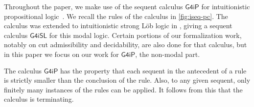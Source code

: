 \documentclass[english,final]{jflart}
\theoremstyle{definition}
\theoremstyle{plain}
\newcommand{\Gfourip}{\mathsf{G4iP}}
\newcommand{\Gfourisl}{\mathsf{G4iSL}}
\begin{document}
Throughout the paper, we make use of the sequent calculus $\Gfourip$ for intuitionistic propositional logic~\cite{Vor1952,Hud1988,Dyc1992}. We recall the rules of the calculus in \cref{fig:iseq-pc}. The calculus was extended to intuitionistic strong Löb logic in \cite{Shillito23}, giving a sequent calculus $\Gfourisl$ for this modal logic. Certain portions of our formalization work, notably on cut admissibility and decidability, are also done for that calculus, but in this paper we focus on our work for $\Gfourip$, the non-modal part.

The calculus $\Gfourip$ has the property that each sequent in the antecedent of a rule is strictly smaller than the conclusion of the rule. Also, to any given sequent, only finitely many instances of the rules can be applied. It follows from this that the calculus is terminating.
\end{document}
